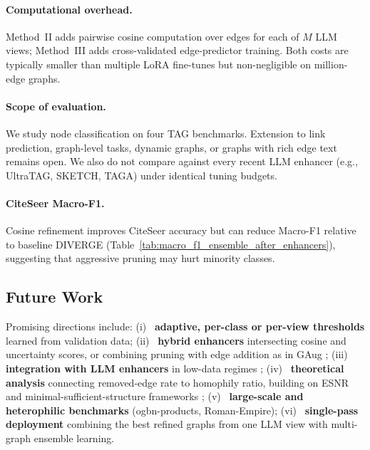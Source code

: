 \paragraph{Computational overhead.}
Method~II adds pairwise cosine computation over edges for each of $M$ LLM views;
Method~III adds cross-validated edge-predictor training. Both costs are typically
smaller than multiple LoRA fine-tunes but non-negligible on million-edge graphs.

\paragraph{Scope of evaluation.}
We study node classification on four TAG benchmarks. Extension to link prediction,
graph-level tasks, dynamic graphs, or graphs with rich edge text remains open. We also
do not compare against every recent LLM enhancer (e.g., UltraTAG, SKETCH, TAGA)
\citep{yu2025ultratag,zhou-etal-2025sketch,zhang2025taga} under identical tuning budgets.

\paragraph{CiteSeer Macro-F1.}
Cosine refinement improves CiteSeer accuracy but can reduce Macro-F1 relative to
baseline DIVERGE (Table~\ref{tab:macro_f1_ensemble_after_enhancers}), suggesting that
aggressive pruning may hurt minority classes.


\subsection{Future Work}
\label{sec:disc-future}

Promising directions include:
(i)~ \textbf{adaptive, per-class or per-view thresholds} learned from validation data;
(ii)~ \textbf{hybrid enhancers} intersecting cosine and uncertainty scores, or combining
pruning with edge addition as in GAug \citep{zhao2021gaug};
(iii)~ \textbf{integration with LLM enhancers} in low-data regimes
\citep{zhang2025leveraging,hu2025gaga};
(iv)~ \textbf{theoretical analysis} connecting removed-edge rate to homophily ratio,
building on ESNR and minimal-sufficient-structure frameworks
\citep{dong2023gps,fatemi2022cogsl};
(v)~ \textbf{large-scale and heterophilic benchmarks} (ogbn-products, Roman-Empire);
(vi)~ \textbf{single-pass deployment} combining the best refined graphs from one LLM
view with multi-graph ensemble learning.


